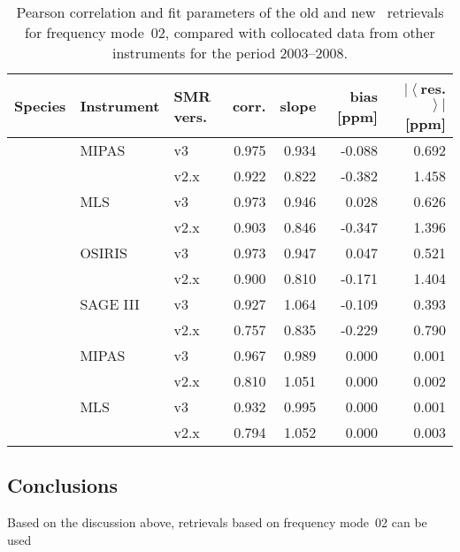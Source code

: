 \begin{table}[hbt]
\centering
\caption{Pearson correlation and fit parameters of the old and new \smr\
retrievals for frequency mode~02, compared with collocated data from other
instruments for the period 2003--2008.
}
\label{tab:fm02:stats}
\begin{tabular}{lllrrrr}
    \toprule
    \textbf{Species} & \textbf{Instrument} & \textbf{SMR vers.} & \textbf{corr.} & \textbf{slope} & \textbf{bias [ppm]} & \textbf{$\left|\left<\right.\right.$res.$\left.\left.\right>\right|$ [ppm]} \\
    \midrule
    \chem{O3}   & MIPAS     & v3    & 0.975 & 0.934 & -0.088    & 0.692 \\
                &           & v2.x  & 0.922 & 0.822 & -0.382    & 1.458 \\
    \cline{2-7}
                & MLS       & v3    & 0.973 & 0.946 & 0.028     & 0.626 \\
                &           & v2.x  & 0.903 & 0.846 & -0.347    & 1.396 \\
    \cline{2-7}
                & OSIRIS    & v3    & 0.973 & 0.947 & 0.047     & 0.521 \\
                &           & v2.x  & 0.900 & 0.810 & -0.171    & 1.404 \\
    \cline{2-7}
                & SAGE III  & v3    & 0.927 & 1.064 & -0.109    & 0.393 \\
                &           & v2.x  & 0.757 & 0.835 & -0.229    & 0.790 \\
    \midrule
    \chem{HNO_3}    & MIPAS     & v3    & 0.967 & 0.989 & 0.000     & 0.001 \\
                    &           & v2.x  & 0.810 & 1.051 & 0.000     & 0.002 \\
    \cline{2-7}
                    & MLS       & v3    & 0.932 & 0.995 & 0.000     & 0.001 \\
                    &           & v2.x  & 0.794 & 1.052 & 0.000     & 0.003 \\
    \bottomrule
\end{tabular}
\end{table}

\subsection{Conclusions}
\label{sec:fm02:conclusions}
Based on the discussion above, retrievals based on frequency mode~02 can be used
